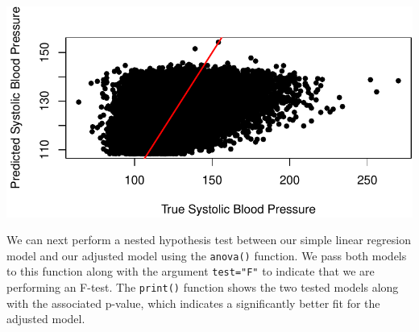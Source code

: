 \documentclass[
  letterpaper,
]{krantz}
\makeatletter
\newenvironment{Shaded}{\begin{snugshade}}{\end{snugshade}}
\newcommand{\AttributeTok}[1]{\textcolor[rgb]{0.40,0.45,0.13}{#1}}
\newcommand{\DecValTok}[1]{\textcolor[rgb]{0.68,0.00,0.00}{#1}}
\newcommand{\FunctionTok}[1]{\textcolor[rgb]{0.28,0.35,0.67}{#1}}
\newcommand{\NormalTok}[1]{\textcolor[rgb]{0.00,0.23,0.31}{#1}}
\newcommand{\SpecialCharTok}[1]{\textcolor[rgb]{0.37,0.37,0.37}{#1}}
\newcommand{\StringTok}[1]{\textcolor[rgb]{0.13,0.47,0.30}{#1}}
\newenvironment{kframe}{%
\medskip{}
\setlength{\fboxsep}{.8em}
 \def\at@end@of@kframe{}%
 \ifinner\ifhmode%
  \def\at@end@of@kframe{\end{minipage}}%
  \begin{minipage}{\columnwidth}%
 \fi\fi%
 \def\FrameCommand##1{\hskip\@totalleftmargin \hskip-\fboxsep
 \colorbox{shadecolor}{##1}\hskip-\fboxsep
     \hskip-\linewidth \hskip-\@totalleftmargin \hskip\columnwidth}%
 \MakeFramed {\advance\hsize-\width
   \@totalleftmargin\z@ \linewidth\hsize
   \@setminipage}}%
 {\par\unskip\endMakeFramed%
 \at@end@of@kframe}
\renewenvironment{Shaded}{\begin{kframe}}{\end{kframe}}
\makeatother
\begin{document}
\begin{Shaded}
\end{Shaded}

\begin{center}
\includegraphics[width=1\textwidth,height=\textheight]{book/linear_regression_files/figure-pdf/unnamed-chunk-12-1.pdf}
\end{center}

We can next perform a nested hypothesis test between our simple linear
regresion model and our adjusted model using the \texttt{anova()}
function. We pass both models to this function along with the argument
\texttt{test="F"} to indicate that we are performing an F-test. The
\texttt{print()} function shows the two tested models along with the
associated p-value, which indicates a significantly better fit for the
adjusted model.
\end{document}
